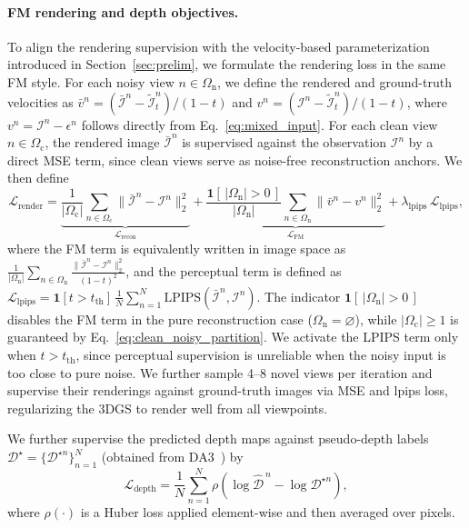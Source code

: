 \paragraph{FM rendering and depth objectives.}
To align the rendering supervision with the velocity-based parameterization introduced in Section~\ref{sec:prelim}, we formulate the rendering loss in the same FM style. For each noisy view $n\in\Omega_{\mathrm n}$, we define the rendered and ground-truth velocities as $\bar{v}^n = (\bar{\mathcal{I}}^n-\tilde{\mathcal{I}}_t^n)/(1-t)$ and $v^n = (\mathcal{I}^n-\tilde{\mathcal{I}}_t^n)/(1-t)$, where $v^n=\mathcal{I}^n-\epsilon^n$ follows directly from Eq.~\eqref{eq:mixed_input}. For each clean view $n\in\Omega_{\mathrm c}$, the rendered image $\bar{\mathcal{I}}^n$ is supervised against the observation $\mathcal{I}^n$ by a direct MSE term, since clean views serve as noise-free reconstruction anchors. We then define
\begin{equation}
\mathcal{L}_{\mathrm{render}}
=
\underbrace{\frac{1}{|\Omega_{\mathrm c}|}\sum_{n\in\Omega_{\mathrm c}}
\|\bar{\mathcal{I}}^n-\mathcal{I}^n\|_2^2}_{\mathcal{L}_{\mathrm{recon}}}
+
\underbrace{\frac{\mathbf{1}[\,|\Omega_{\mathrm n}|>0\,]}{|\Omega_{\mathrm n}|}\sum_{n\in\Omega_{\mathrm n}}
\|\bar{v}^n-v^n\|_2^2}_{\mathcal{L}_{\mathrm{FM}}}
+
\lambda_{\mathrm{lpips}}\,\mathcal{L}_{\mathrm{lpips}},
\label{eq:lrender}
\end{equation}
where the FM term is equivalently written in image space as $
\frac{1}{|\Omega_{\mathrm n}|}\sum_{n\in\Omega_{\mathrm n}}
\frac{\|\bar{\mathcal{I}}^n-\mathcal{I}^n\|_2^2}{(1-t)^2}$,
and the perceptual term is defined as $\mathcal{L}_{\mathrm{lpips}}=\mathbf{1}[t>t_{\mathrm{th}}]\,\frac{1}{N}\sum_{n=1}^{N}\mathrm{LPIPS}(\bar{\mathcal{I}}^n,\mathcal{I}^n)$. The indicator $\mathbf{1}[\,|\Omega_{\mathrm n}|>0\,]$ disables the FM term in the pure reconstruction case ($\Omega_{\mathrm n}=\varnothing$), while $|\Omega_{\mathrm c}|\ge 1$ is guaranteed by Eq.~\eqref{eq:clean_noisy_partition}. We activate the LPIPS term only when $t>t_{\mathrm{th}}$, since perceptual supervision is unreliable when the noisy input is too close to pure noise. We further sample 4–8 novel views per iteration and supervise their renderings against ground-truth images via MSE and lpips loss, regularizing the 3DGS to render well from all viewpoints.



We further supervise the predicted depth maps against pseudo-depth labels $\mathcal{D}^{\star}=\{\mathcal{D}^{\star n}\}_{n=1}^{N}$ (obtained from DA3~\citep{lin2025depth}) by
\begin{equation}
\mathcal{L}_{\mathrm{depth}}
=
\frac{1}{N}\sum_{n=1}^{N}
\rho\!\left(
\log \hat{\mathcal{D}}^{\,n}
-
\log \mathcal{D}^{\star n}
\right),
\label{eq:ldepth}
\end{equation}
where $\rho(\cdot)$ is a Huber loss applied element-wise and then averaged over pixels.

